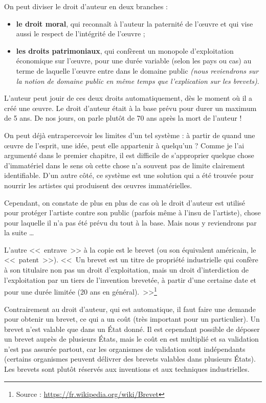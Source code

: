 On peut diviser le droit d'auteur en deux branches :
\begin{itemize}
\item \textbf{le droit moral}, qui reconnaît à l'auteur la paternité de l'œuvre et qui vise aussi le respect de l'intégrité de l'œuvre ;
\item \textbf{les droits patrimoniaux}, qui confèrent un monopole d'exploitation économique sur l'œuvre, pour une durée variable (selon les pays ou cas) au terme de laquelle l'œuvre entre dans le domaine public \textit{(nous reviendrons sur la notion de domaine public en même temps que l'explication sur les brevets)}.
\end{itemize}\bigskip

L'auteur peut jouir de ces deux droits automatiquement, dès le moment où il a créé une œuvre.
Le droit d'auteur était à la base prévu pour durer un maximum de 5 ans.
De nos jours, on parle plutôt de 70 ans après la mort de l'auteur !

On peut déjà entrapercevoir les limites d'un tel système : à partir de quand une œuvre de l'esprit, une idée, peut elle appartenir à quelqu'un ?
Comme je l'ai argumenté dans le premier chapitre, il est difficile de s'approprier quelque chose d'immatériel dans le sens où cette chose n'a souvent pas de limite clairement identifiable.
D'un autre côté, ce système est une solution qui a été trouvée pour nourrir les artistes qui produisent des œuvres immatérielles.

Cependant, on constate de plus en plus de cas où le droit d'auteur est utilisé pour protéger l'artiste contre son public (parfois même à l'insu de l'artiste), chose pour laquelle il n'a pas été prévu du tout à la base.
Mais nous y reviendrons par la suite \dots{}

L'autre <<~entrave~>> à la copie est le brevet (ou son équivalent américain, le <<~patent~>>).
<<~Un brevet est un titre de propriété industrielle qui confère à son titulaire non pas un droit d'exploitation, mais un droit d'interdiction de l'exploitation par un tiers de l'invention brevetée, à partir d'une certaine date et pour une durée limitée (20 ans en général).~>>\footnote{Source : \url{https://fr.wikipedia.org/wiki/Brevet}}

Contrairement au droit d'auteur, qui est automatique, il faut faire une demande pour obtenir un brevet, ce qui a un coût (très important pour un particulier).
Un brevet n'est valable que dans un État donné.
Il est cependant possible de déposer un brevet auprès de plusieurs États, mais le coût en est multiplié et sa validation n'est pas assurée partout, car les organismes de validation sont indépendants (certains organismes peuvent délivrer des brevets valables dans plusieurs États).
Les brevets sont plutôt réservés aux inventions et aux techniques industrielles.

